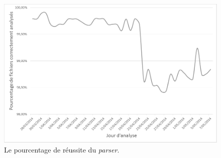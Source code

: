 \begin{figure}[!h]
	\centering
	\includegraphics[scale=.6]{Exp_40jours/Exp1_parser_success_rate_NB.png}
	\caption{\label{Exp1_parser_success_rate}Le pourcentage de réussite du \textit{parser}.}
\end{figure}

